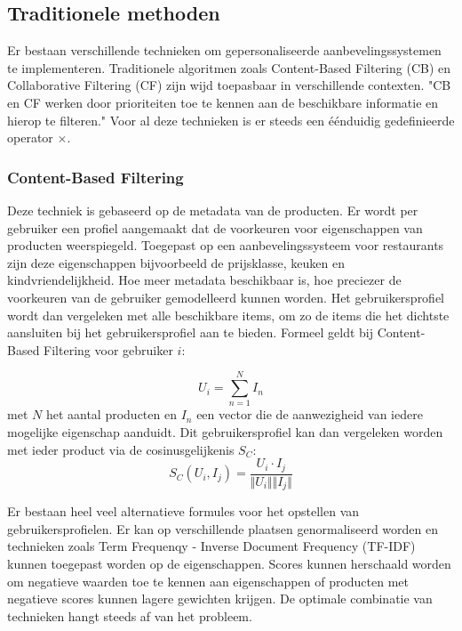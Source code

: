 \subsection{Traditionele methoden}
\label{sec:chapt2_traditionele_methoden}
Er bestaan verschillende technieken om gepersonaliseerde aanbevelingssystemen te implementeren. Traditionele algoritmen zoals Content-Based Filtering (CB) en Collaborative Filtering (CF) zijn wijd toepasbaar in verschillende contexten. "CB en CF werken door prioriteiten toe te kennen aan de beschikbare informatie en hierop te filteren." \cite{overzicht_technieken} Voor al deze technieken is er steeds een éénduidig gedefinieerde operator $\times$.


\subsubsection{Content-Based Filtering}
\label{seq:chapt2_cb}
Deze techniek is gebaseerd op de metadata van de producten. Er wordt per gebruiker een profiel aangemaakt dat de voorkeuren voor eigenschappen van producten weerspiegeld. Toegepast op een aanbevelingssysteem voor restaurants zijn deze eigenschappen bijvoorbeeld de prijsklasse, keuken en kindvriendelijkheid. Hoe meer metadata beschikbaar is, hoe preciezer de voorkeuren van de gebruiker gemodelleerd kunnen worden. Het gebruikersprofiel wordt dan vergeleken met alle beschikbare items, om zo de items die het dichtste aansluiten bij het gebruikersprofiel aan te bieden. Formeel geldt bij Content-Based Filtering voor gebruiker $i$:


\begin{equation}
    U_i = \sum_{n=1}^{N} I_n
    \label{eq:chap2_cb_user_profile}
\end{equation}
met $N$ het aantal producten en $I_n$ een vector die de aanwezigheid van iedere mogelijke eigenschap aanduidt. Dit gebruikersprofiel kan dan vergeleken worden met ieder product via de cosinusgelijkenis $S_C$:
\begin{equation}
    S_C(U_i, I_j) = \frac{U_i \cdot I_j}{\Vert U_i \Vert \Vert I_j \Vert}
    \label{eq:chap2_cb_cosine_similarity}
\end{equation}

Er bestaan heel veel alternatieve formules voor het opstellen van gebruikersprofielen. Er kan op verschillende plaatsen genormaliseerd worden en technieken zoals Term Frequenqy - Inverse Document Frequency (TF-IDF) kunnen toegepast worden op de eigenschappen. Scores kunnen herschaald worden om negatieve waarden toe te kennen aan eigenschappen of producten met negatieve scores kunnen lagere gewichten krijgen. De optimale combinatie van technieken hangt steeds af van het probleem.


